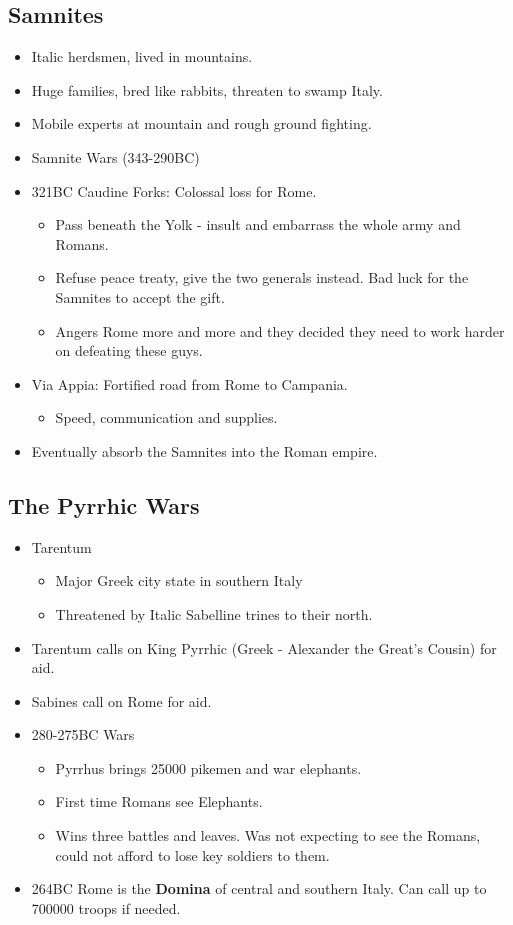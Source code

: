 \documentclass[12pt, twoside]{article}
\begin{document}
\subsection{Samnites}
\begin{itemize}
\item Italic herdsmen, lived in mountains.
\item Huge families, bred like rabbits, threaten to swamp Italy.
\item Mobile experts at mountain and rough ground fighting.
\item Samnite Wars (343-290BC)
\item 321BC Caudine Forks: Colossal loss for Rome.
	\begin{itemize}
	\item Pass beneath the Yolk - insult and embarrass the whole army and Romans.
	\item Refuse peace treaty, give the two generals instead.  Bad luck for the Samnites to accept the gift.
	\item Angers Rome more and more and they decided they need to work harder on defeating these guys.
	\end{itemize} 
\item Via Appia: Fortified road from Rome to Campania.
	\begin{itemize}
	\item Speed, communication and supplies.
	\end{itemize}
\item Eventually absorb the Samnites into the Roman empire.
\end{itemize}

\subsection{The Pyrrhic Wars}
\begin{itemize}
\item Tarentum
	\begin{itemize}
	\item Major Greek city state in southern Italy
	\item Threatened by Italic Sabelline trines to their north. 
	\end{itemize}
\item Tarentum calls on King Pyrrhic (Greek - Alexander the Great's Cousin) for aid.
\item Sabines call on Rome for aid.
\item 280-275BC Wars
	\begin{itemize}
	\item Pyrrhus brings 25000 pikemen and war elephants.
	\item First time Romans see Elephants.
	\item Wins three battles and leaves. Was not expecting to see the Romans, could not afford to lose key soldiers to them.
	\end{itemize}
\item 264BC Rome is the \textbf{Domina} of central and southern Italy.  Can call up to 700000 troops if needed.
\end{itemize}
\end{document}
